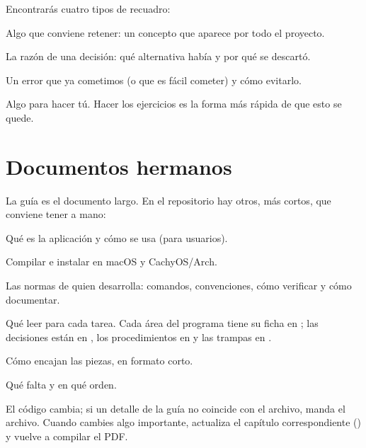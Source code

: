 Encontrarás cuatro tipos de recuadro:

\begin{idea}
Algo que conviene retener: un concepto que aparece por todo el proyecto.
\end{idea}

\begin{porque}
La razón de una decisión: qué alternativa había y por qué se descartó.
\end{porque}

\begin{trampa}
Un error que ya cometimos (o que es fácil cometer) y cómo evitarlo.
\end{trampa}

\begin{ejercicio}
Algo para hacer tú. Hacer los ejercicios es la forma más rápida de que esto se quede.
\end{ejercicio}

\section{Documentos hermanos}

La guía es el documento largo. En el repositorio hay otros, más cortos, que conviene tener a
mano:

\begin{description}[leftmargin=1.2em]
  \item[\archivo{README.md}] Qué es la aplicación y cómo se usa (para usuarios).
  \item[\archivo{COMPILAR.md}] Compilar e instalar en macOS y CachyOS/Arch.
  \item[\archivo{docs/AGENTES.md}] Las normas de quien desarrolla: comandos, convenciones,
  cómo verificar y cómo documentar.
  \item[\archivo{docs/INDEX.md}] Qué leer para cada tarea. Cada área del programa tiene su
  ficha en ; las decisiones están en , los
  procedimientos en  y las trampas en .
  \item[\archivo{docs/ARCHITECTURE.md}] Cómo encajan las piezas, en formato corto.
  \item[\archivo{docs/ROADMAP.md}] Qué falta y en qué orden.
\end{description}

\begin{trampa}
El código cambia; si un detalle de la guía no coincide con el archivo, manda el archivo.
Cuando cambies algo importante, actualiza el capítulo correspondiente
() y vuelve a compilar el PDF.
\end{trampa}
